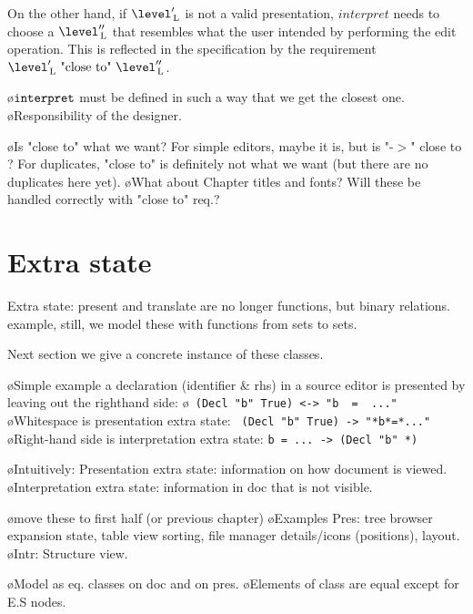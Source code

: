 
On the other hand, if $\level'\L$ is not a valid presentation, $interpret$ needs to choose a  $\level''\L$ that resembles what the user intended by performing the edit operation. This is reflected in the specification by the requirement $\level'\L~\text{"close to"}~\level''\L$.

\bl
\o ${\tt interpret}$ must be defined in such a way that we get the closest one.
\o Responsibility of the designer.
\el

\bl
\o Is "close to" what we want? For simple editors, maybe it is, but is "-$>$" close to \rarr? For duplicates, "close to" is definitely not what we want (but there are no duplicates here yet).
\o What about Chapter titles and fonts? Will these be handled correctly with "close to" req.?
\el





%																
%																
%																
\section{Extra state} \label{sect:singleExtra}


Extra state: present and translate are no longer functions, but binary relations. example, still, we model these with functions from sets to sets.

Next section we give a concrete instance of these classes.

\bl
\o Simple example a declaration (identifier \& rhs) in a source editor is presented by leaving out the righthand side:
\o  \verb| (Decl "b" True) <-> "b  =  ..."|
\o Whitespace is presentation extra state: \verb| (Decl "b" True) -> "*b*=*..."|
\o Right-hand side is interpretation extra state: \verb|b = ... -> (Decl "b" *)|
\el

\bl
\o Intuitively: Presentation extra state: information on how document is viewed. 
\o Interpretation extra state: information in doc that is not visible. 
\el

\bl
\o move these to first half (or previous chapter)
\o Examples Pres: tree browser expansion state, table view sorting, file manager details/icons (positions), layout.
\o Intr: Structure view.
\el

\bl
\o Model as eq. classes on doc and on pres.
\o Elements of class are equal except for E.S nodes.
\el


